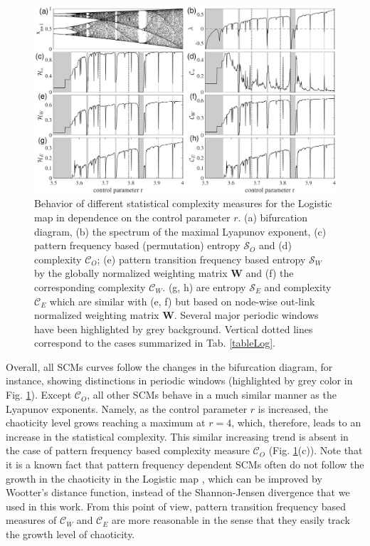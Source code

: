 \documentclass[12pt,aip,cha,reprint,nofootinbib]{revtex4-1}
\begin{document}
\begin{figure}
	\centering 
	\includegraphics[width=2\columnwidth]{logisticEntropy.pdf}
\caption{\small{Behavior of different statistical complexity measures for the Logistic map in dependence on the control parameter $r$. (a) bifurcation diagram, (b) the spectrum of the maximal Lyapunov exponent, (c) pattern frequency based (permutation) entropy $\mathcal{S}_O$ and (d) complexity $\mathcal{C}_O$; (e) pattern transition frequency based entropy $\mathcal{S}_W$ by the globally normalized weighting matrix $\mathbf{W}$ and (f) the corresponding complexity $\mathcal{C}_W$. (g, h) are entropy $\mathcal{S}_E$ and complexity $\mathcal{C}_E$ which are similar with (e, f) but based on node-wise out-link normalized weighting matrix $\mathbf{W}$. Several major periodic windows have been highlighted by grey background. Vertical dotted lines correspond to the cases summarized in Tab. \ref{tableLog}. } \label{fig:bifurcation}}
\end{figure}

Overall, all SCMs curves follow the changes in the bifurcation diagram, for instance, showing distinctions in periodic windows  (highlighted by grey color in Fig. \ref{fig:bifurcation}). Except $\mathcal{C}_O$, all other SCMs behave in a much similar manner as the Lyapunov exponents. Namely, as the control parameter $r$ is increased, the chaoticity level grows reaching a maximum at $r = 4$, which, therefore, leads to an increase in the statistical complexity. This similar increasing trend is absent in the case of pattern frequency based complexity measure $\mathcal{C}_O$ (Fig. \ref{fig:bifurcation}(c)). Note that it is a known fact that pattern frequency dependent SCMs often do not follow the growth in the chaoticity in the Logistic map \cite{MartinPLA2003}, which can be improved by Wootter's distance function, instead of the Shannon-Jensen divergence that we used in this work. From this point of view, pattern transition frequency based measures of $\mathcal{C}_W$ and $\mathcal{C}_E$ are more reasonable in the sense that they easily track the growth level of chaoticity. 
\end{document}
